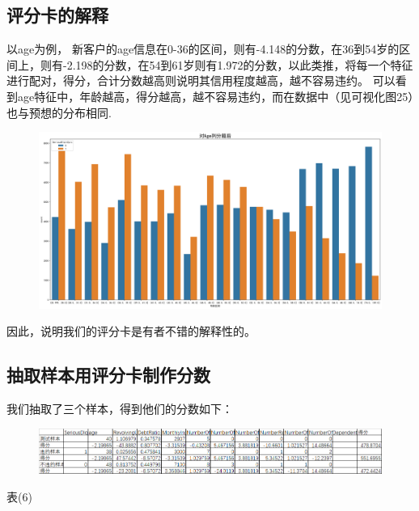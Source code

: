 \documentclass[12pt]{article}
\begin{document}
\newpage
\subsection{评分卡的解释}

\begin{flushleft}
	\noindent\qquad 以age为例， 新客户的age信息在0-36的区间，则有-4.148的分数，在36到54岁的区间上，则有-2.198的分数，在54到61岁则有1.972的分数，以此类推，将每一个特征进行配对，得分，合计分数越高则说明其信用程度越高，越不容易违约。
	\noindent\qquad	可以看到age特征中，年龄越高，得分越高，越不容易违约，而在数据中（见可视化图25）也与预想的分布相同.
\end{flushleft}
\vspace{2cm}
\begin{figure}[H]
	\centering
	\includegraphics[width=1\linewidth]{figures/age}
	\caption{}
	\label{年龄越大，违约人数占比越小}
\end{figure}
\vspace{2cm}
\begin{flushleft}
	\noindent\qquad 因此，说明我们的评分卡是有者不错的解释性的。
\end{flushleft}






\newpage
\subsection{抽取样本用评分卡制作分数}

\begin{flushleft}
	\noindent\qquad 我们抽取了三个样本，得到他们的分数如下：
	
	
\end{flushleft}
\begin{figure}[H]
	\centering
	\includegraphics[width=1\linewidth]{figures/pin3}
\end{figure}
\begin{center}
	表(6)
\end{center}
\end{document}
